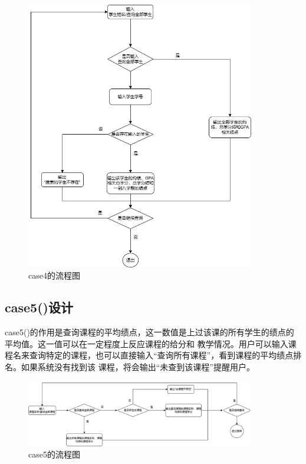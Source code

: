 \documentclass[fontset=windows]{article}
\begin{document}
\begin{figure}[h]
	\begin{center}
		\includegraphics[width = 10cm]{case4.png}
		\vspace{1cm}
		\caption{case4的流程图}
	\end{center}
\end{figure}
\subsection{case5()设计}
case5()的作用是查询课程的平均绩点，这一数值是上过该课的所有学生的绩点的平均值。这一值可以在一定程度上反应课程的给分和
教学情况。用户可以输入课程名来查询特定的课程，也可以直接输入“查询所有课程”，看到课程的平均绩点排名。如果系统没有找到该
课程，将会输出“未查到该课程”提醒用户。
\begin{figure}[h!]
	\begin{center}
		\vspace{0.5cm}
		\includegraphics[width = 10cm]{case5.png}
		\vspace{0.5cm}
		\caption{case5的流程图}
	\end{center}
\end{figure}
\newpage
\end{document}
